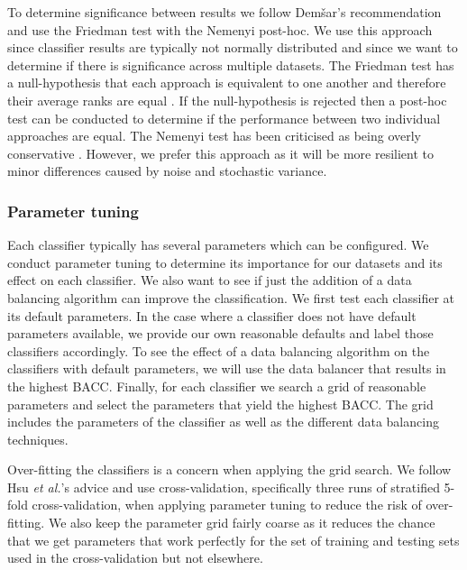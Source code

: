 \documentclass{sig-alternate-05-2015}
\begin{document}
	To determine significance between results we follow Dem\v{s}ar's \cite{Demsar:2006:SCC:1248547.1248548} recommendation and use the Friedman test with the Nemenyi post-hoc. We use this approach since classifier results are typically not normally distributed and since we want to determine if there is significance across multiple datasets. The Friedman test has a null-hypothesis that each approach is equivalent to one another and therefore their average ranks are equal \cite{Demsar:2006:SCC:1248547.1248548}. If the null-hypothesis is rejected then a post-hoc test can be conducted to determine if the performance between two individual approaches are equal. The Nemenyi test has been criticised as being overly conservative \cite{garcia2008extension}. However, we prefer this approach as it will be more resilient to minor differences caused by noise and stochastic variance.
	
	\subsubsection{Parameter tuning}
	\label{parameter_tuning}
	Each classifier typically has several parameters which can be configured. We conduct parameter tuning to determine its importance for our datasets and its effect on each classifier. We also want to see if just the addition of a data balancing algorithm can improve the classification. We first test each classifier at its default parameters. In the case where a classifier does not have default parameters available, we provide our own reasonable defaults and label those classifiers accordingly. To see the effect of a data balancing algorithm on the classifiers with default parameters, we will use the data balancer that results in the highest BACC. Finally, for each classifier we search a grid of reasonable parameters and select the parameters that yield the highest BACC. The grid includes the parameters of the classifier as well as the different data balancing techniques.
	
	Over-fitting the classifiers is a concern when applying the grid search. We follow Hsu \textit{et al.}'s \cite{hsu2003practical} advice and use cross-validation, specifically three runs of stratified 5-fold cross-validation, when applying parameter tuning to reduce the risk of over-fitting. We also keep the parameter grid fairly coarse as it reduces the chance that we get parameters that work perfectly for the set of training and testing sets used in the cross-validation but not elsewhere.
	
\end{document}
